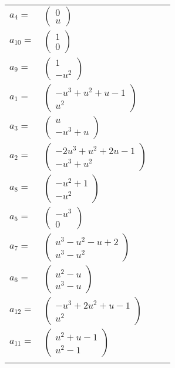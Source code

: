 \documentclass[1p]{elsarticle_modified}
\theoremstyle{definition}
\begin{document}
\begin{tabular}{m{7pt} m{180pt} m{7pt} m{180pt} }
\flushright $a_{4}=$&$\begin{pmatrix}0\\u\end{pmatrix}$ \\
\flushright $a_{10}=$&$\begin{pmatrix}1\\0\end{pmatrix}$ \\
\flushright $a_{9}=$&$\begin{pmatrix}1\\- u^2\end{pmatrix}$ \\
\flushright $a_{1}=$&$\begin{pmatrix}- u^3+u^2+u-1\\u^2\end{pmatrix}$ \\
\flushright $a_{3}=$&$\begin{pmatrix}u\\- u^3+u\end{pmatrix}$ \\
\flushright $a_{2}=$&$\begin{pmatrix}-2 u^3+u^2+2 u-1\\- u^3+u^2\end{pmatrix}$ \\
\flushright $a_{8}=$&$\begin{pmatrix}- u^2+1\\- u^2\end{pmatrix}$ \\
\flushright $a_{5}=$&$\begin{pmatrix}- u^3\\0\end{pmatrix}$ \\
\flushright $a_{7}=$&$\begin{pmatrix}u^3- u^2- u+2\\u^3- u^2\end{pmatrix}$ \\
\flushright $a_{6}=$&$\begin{pmatrix}u^2- u\\u^3- u\end{pmatrix}$ \\
\flushright $a_{12}=$&$\begin{pmatrix}- u^3+2 u^2+u-1\\u^2\end{pmatrix}$ \\
\flushright $a_{11}=$&$\begin{pmatrix}u^2+u-1\\u^2-1\end{pmatrix}$\\&\end{tabular}
\end{document}
